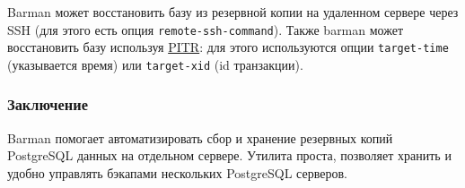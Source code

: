 Barman может восстановить базу из резервной копии на удаленном сервере через SSH (для этого есть опция \lstinline!remote-ssh-command!). Также barman может восстановить базу используя \href{http://en.wikipedia.org/wiki/Point-in-time\_recovery}{PITR}: для этого используются опции \lstinline!target-time! (указывается время) или \lstinline!target-xid! (id транзакции).


\subsubsection{Заключение}

Barman помогает автоматизировать сбор и хранение резервных копий PostgreSQL данных на отдельном сервере. Утилита проста, позволяет хранить и удобно управлять бэкапами нескольких PostgreSQL серверов.
